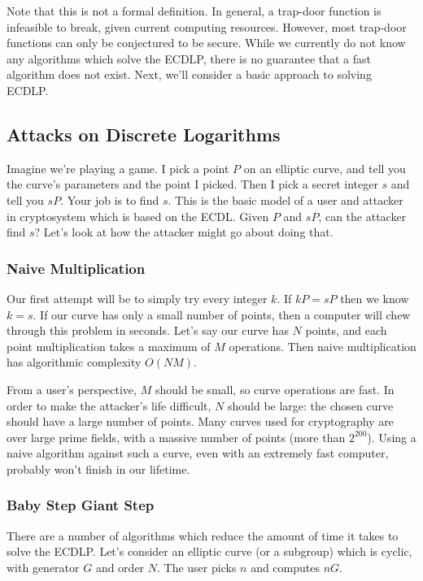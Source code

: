 \documentclass{article}
\begin{document}
Note that this is not a formal definition.
In general, a trap-door function is infeasible to break, given current computing resources.
However, most trap-door functions can only be conjectured to be secure.
While we currently do not know any algorithms which solve the ECDLP, there is no guarantee that a fast algorithm does not exist.
Next, we'll consider a basic approach to solving ECDLP.

\subsection{Attacks on Discrete Logarithms}
Imagine we're playing a game.
I pick a point $P$ on an elliptic curve, and tell you the curve's parameters and the point I picked.
Then I pick a secret integer $s$ and tell you $sP$. Your job is to find $s$.
This is the basic model of a user and attacker in cryptosystem which is based on the ECDL.
Given $P$ and $sP$, can the attacker find $s$? Let's look at how the attacker might go about doing that.

\subsubsection{Naive Multiplication}
Our first attempt will be to simply try every integer $k$.
If $kP = sP$ then we know $k = s$.
If our curve has only a small number of points, then a computer will chew through this problem in seconds.
Let's say our curve has $N$ points, and each point multiplication takes a maximum of $M$ operations.
Then naive multiplication has algorithmic complexity $O(NM)$.

From a user's perspective, $M$ should be small, so curve operations are fast.
In order to make the attacker's life difficult, $N$ should be large: the chosen curve should have a large number of points.
Many curves used for cryptography are over large prime fields, with a massive number of points (more than $2^{200}$).
Using a naive algorithm against such a curve, even with an extremely fast computer, probably won't finish in our lifetime.

\subsubsection{Baby Step Giant Step}
There are a number of algorithms which reduce the amount of time it takes to solve the ECDLP.
Let's consider an elliptic curve (or a subgroup) which is cyclic, with generator $G$ and order $N$.
The user picks $n$ and computes $nG$. 
\end{document}
